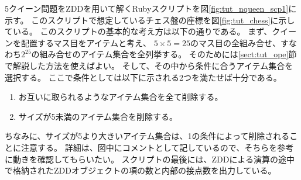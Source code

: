 5クイーン問題をZDDを用いて解くRubyスクリプトを図\ref{fig:tut_nqueen_scp1}に示す。
このスクリプトで想定しているチェス盤の座標を図\ref{fig:tut_chess}に示している。
このスクリプトの基本的な考え方は以下の通りである。
まず、クイーンを配置するマス目をアイテムと考え、
$5\times 5=25$のマス目の全組み合せ、すなわち$2^{25}$の組み合せのアイテム集合を全列挙する。
そのためには\ref{sect:tut_ope}節で解説した方法を使えばよい。
そして、その中から条件に合うアイテム集合を選択する。
ここで条件としては以下に示される2つを満たせば十分である。
\begin{enumerate}
\item お互いに取られるようなアイテム集合を全て削除する。
\item サイズが5未満のアイテム集合を削除する。
\end{enumerate}
ちなみに、サイズが5より大きいアイテム集合は、1の条件によって削除されることに注意する。
詳細は、図中にコメントとして記しているので、そちらを参考に動きを確認してもらいたい。
スクリプトの最後には、ZDDによる演算の途中で格納されたZDDオブジェクトの項の数と内部の接点数を出力している。

